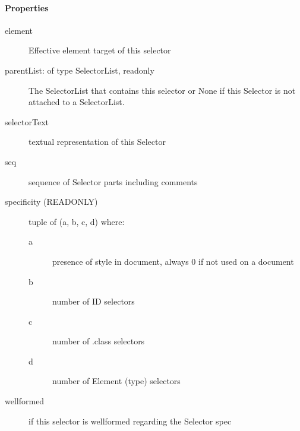 \paragraph*{Properties}
\label{properties}
\begin{description}
\item[{element}] \leavevmode 
Effective element target of this selector

\item[{parentList: of type SelectorList, readonly}] \leavevmode 
The SelectorList that contains this selector or None if this
Selector is not attached to a SelectorList.

\item[{selectorText}] \leavevmode 
textual representation of this Selector

\item[{seq}] \leavevmode 
sequence of Selector parts including comments

\item[{specificity (READONLY)}] \leavevmode 
tuple of (a, b, c, d) where:
\begin{description}
\item[{a}] \leavevmode 
presence of style in document, always 0 if not used on a document

\item[{b}] \leavevmode 
number of ID selectors

\item[{c}] \leavevmode 
number of .class selectors

\item[{d}] \leavevmode 
number of Element (type) selectors

\end{description}

\item[{wellformed}] \leavevmode 
if this selector is wellformed regarding the Selector spec

\end{description}



\hypertarget{format}{}
